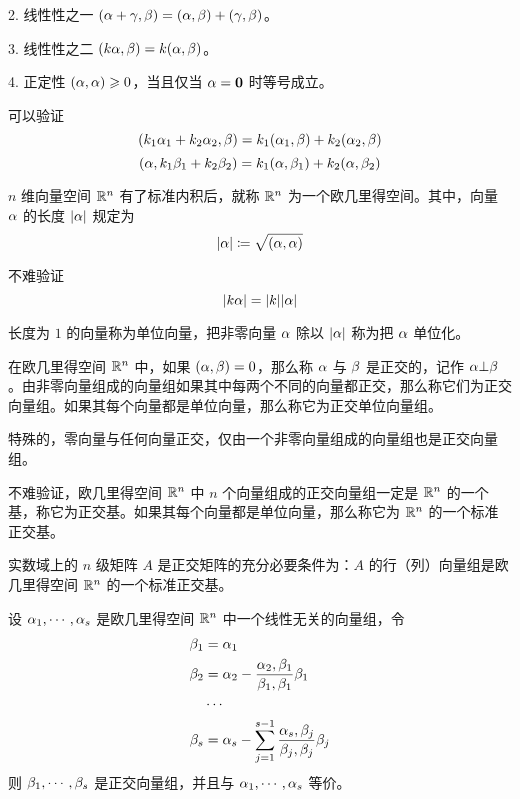 2. 线性性之一 $(\alpha+\gamma,\beta) = (\alpha,\beta) + (\gamma,\beta)$。

3. 线性性之二 $(k\alpha,\beta) = k(\alpha,\beta)$。

4. 正定性 $(\alpha,\alpha)\geqslant 0$，当且仅当 $\alpha=\boldsymbol{0}$ 时等号成立。

可以验证
\[(k_1\alpha_1+k_2\alpha_2,\beta) = k_1(\alpha_1,\beta) + k_2(\alpha_2,\beta)\]
\[(\alpha,k_1\beta_1+k_2\beta_2) = k_1(\alpha,\beta_1) + k_2(\alpha,\beta_2)\]

$n$ 维向量空间 $\mathbb{R}^n$ 有了标准内积后，就称 $\mathbb{R}^n$ 为一个欧几里得空间。其中，向量 $\alpha$ 的长度 $|\alpha|$ 规定为
\[|\alpha| \coloneqq  \sqrt{(\alpha,\alpha)}\]

不难验证
\[|k\alpha| = |k||\alpha|\]

长度为 $1$ 的向量称为单位向量，把非零向量 $\alpha$ 除以 $|\alpha|$ 称为把 $\alpha$ 单位化。

在欧几里得空间 $\mathbb{R}^n$ 中，如果 $(\alpha,\beta)=0$，那么称 $\alpha$ 与 $\beta$ 是正交的，记作 $\alpha \bot \beta$。由非零向量组成的向量组如果其中每两个不同的向量都正交，那么称它们为正交向量组。如果其每个向量都是单位向量，那么称它为正交单位向量组。

特殊的，零向量与任何向量正交，仅由一个非零向量组成的向量组也是正交向量组。

不难验证，欧几里得空间 $\mathbb{R}^n$ 中 $n$ 个向量组成的正交向量组一定是 $\mathbb{R}^n$ 的一个基，称它为正交基。如果其每个向量都是单位向量，那么称它为 $\mathbb{R}^n$ 的一个标准正交基。

\begin{theorem}
    实数域上的 $n$ 级矩阵 $A$ 是正交矩阵的充分必要条件为：$A$ 的行（列）向量组是欧几里得空间 $\mathbb{R}^n$ 的一个标准正交基。
\end{theorem}

\begin{theorem}
    设 $\alpha_1,\cdots,\alpha_s$ 是欧几里得空间 $\mathbb{R}^n$ 中一个线性无关的向量组，令
    \begin{equation*}
        \begin{aligned}
            \beta_1&=\alpha_1\\
            \beta_2&=\alpha_2 - \frac{\alpha_2,\beta_1}{\beta_1,\beta_1}\beta_1\\
            &\cdots \\
            \beta_s &= \alpha_s-\sum_{j=1}^{s-1}\frac{\alpha_s,\beta_j}{\beta_j,\beta_j}\beta_j
        \end{aligned}
    \end{equation*}
    则 $\beta_1,\cdots,\beta_s$ 是正交向量组，并且与 $\alpha_1,\cdots,\alpha_s$ 等价。
\end{theorem}

